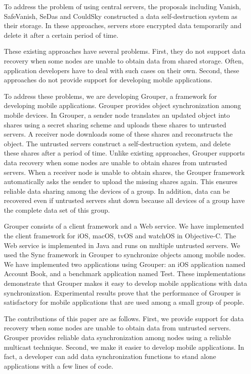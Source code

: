 \documentclass{sig-alternate-05-2015}
\begin{document}
To address the problem of using central servers, the proposals including Vanish\cite{geambasu2009vanish}, SafeVanish\cite{zeng2010safevanish}, SeDas\cite{zeng2012sedas} and CouldSky\cite{zeng2015cloudsky} constructed a data self-destruction system as their storage.
In these approaches, servers store encrypted data temporarily and delete it after a certain period of time.

These existing approaches have several problems.
First, they do not support data recovery when some nodes are unable to obtain data from shared storage.
Often, application developers have to deal with such cases on their own.
Second, these approaches do not provide support for developing mobile applications.

To address these problems, we are developing Grouper, a framework for developing mobile applications. 
Grouper provides object synchronization among mobile devices.
In Grouper, a sender node translates an updated object into shares using a secret sharing scheme and uploads these shares to untrusted servers. 
A receiver node downloads some of these shares and reconstructs the object.
The untrusted servers construct a self-destruction system, and delete these shares after a period of time.
Unlike existing approaches, Grouper supports data recovery when some nodes are unable to obtain shares from untrusted servers.
When a receiver node is unable to obtain shares, the Grouper framework automatically asks the sender to upload the missing shares again.
This ensures reliable data sharing among the devices of a group.
In addition, data can be recovered even if untrusted servers shut down because all devices of a group have the complete data set of this group.

Grouper consists of a client framework and a Web service.
We have implemented the client framework for iOS, macOS, tvOS and watchOS in Objective-C.
The Web service is implemented in Java and runs on multiple untrusted servers.
We used the Sync\cite{sync} framework in Grouper to synchronize objects among mobile nodes.
We have implemented two applications using Grouper: an iOS application named Account Book, and a benchmark application named Test.
These implementations demonstrate that Grouper makes it easy to develop mobile applications with data synchronization.
Experimental results prove that the performance of Grouper is satisfactory for mobile applications that are used among a small group of people.

The contributions of this paper are as follows.
First, we provide support for data recovery when some nodes are unable to obtain data from untrusted servers.
Grouper provides reliable data synchronization among nodes using a reliable multicast technique.
Second, we make it easier to develop mobile applications.
In fact, a developer can add data synchronization functions to stand alone applications with a few lines of code.
\end{document}
